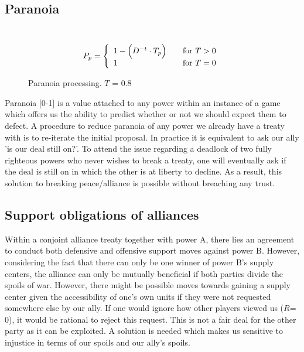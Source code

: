 \documentclass[a4paper]{article} %
\begin{document}
\subsection{Paranoia}
\
  \[ P_p = \left\{ 
  \begin{array}{l l}
    1 - \Big( D^{-t} \cdot T_p \Big) & \quad \text{for $T > 0$} \\
  1 & \quad \text{for $T = 0$}
    
  \end{array} \right.\]
\begin{figure}[H]
\centering
{}
\caption{Paranoia processing. $T$ = 0.8}
\label{fig:graph2}
\end{figure}


Paranoia [0-1]  is a value attached to any power within an instance of a game which offers us the ability to predict whether or not we should expect them to defect. A procedure to reduce paranoia of any power we already have a treaty with is to re-iterate the initial proposal. In practice it is equivalent to ask our ally 'is our deal still on?'. To attend the issue regarding a deadlock of two fully righteous powers who never wishes to break a treaty, one will eventually ask if the deal is still on in which the other is at liberty to decline. As a result, this solution to breaking peace/alliance is possible without breaching any trust.


\subsection{Support obligations of alliances}

Within a conjoint alliance treaty together with power A, there lies an agreement to conduct both defensive and offensive support moves against power B. However, considering the fact that there can only be one winner of power B’s supply centers, the alliance can only be mutually beneficial if both parties divide the spoils of war. However, there might be possible moves towards gaining a supply center given the accessibility of one's own units if they were not requested somewhere else by our ally. If one would ignore how other players viewed us ($R$= 0), it would be rational to reject this request. This is not a fair deal for the other party as it can be exploited. A solution is needed which makes us sensitive to injustice in terms of our spoils and our ally's spoils.
\end{document}
